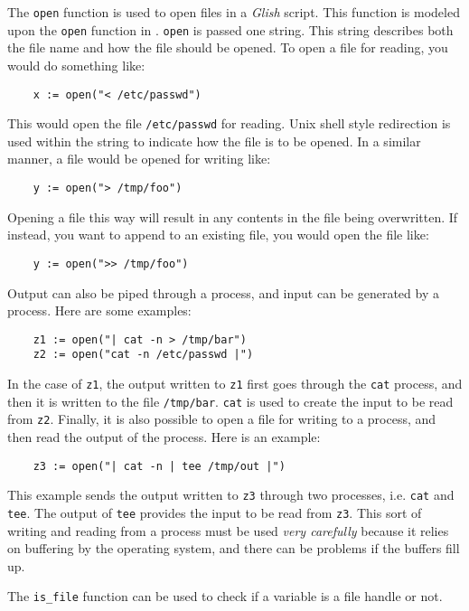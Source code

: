 The {\tt open} function is used to open files in a {\em Glish} script. This function is
modeled upon the {\tt open} function in . {\tt open}
is passed one string. This string describes both the file name and how the file should be opened.
To open a file for reading, you would do something like:
\begin{verbatim}
    x := open("< /etc/passwd")
\end{verbatim}
This would open the file {\tt /etc/passwd} for reading. {\sc Unix} shell style redirection is
used within the string to indicate how the file is to be opened. In a similar manner, a
file would be opened for writing like:
\begin{verbatim}
    y := open("> /tmp/foo")
\end{verbatim}
Opening a file this way will result in any contents in the file being overwritten. If instead,
you want to append to an existing file, you would open the file like:
\begin{verbatim}
    y := open(">> /tmp/foo")
\end{verbatim}
Output can also be piped through a process, and input can be generated by a process. Here
are some examples:
\begin{verbatim}
    z1 := open("| cat -n > /tmp/bar")
    z2 := open("cat -n /etc/passwd |")
\end{verbatim}
In the case of {\tt z1}, the output written to {\tt z1} first goes through the {\tt cat}
process, and then it is written to the file {\tt /tmp/bar}. {\tt cat} is used to create
the input to be read from {\tt z2}. Finally, it is also possible to open a file for writing
to a process, and then read the output of the process. Here is an example:
\begin{verbatim}
    z3 := open("| cat -n | tee /tmp/out |")
\end{verbatim}
This example sends the output written to {\tt z3} through two processes, i.e. {\tt cat} and
{\tt tee}. The output of {\tt tee} provides the input to be read from {\tt z3}. This sort of
writing and reading from a process must be used {\em very carefully} because it relies on
buffering by the operating system, and there can be problems if the buffers fill up.

\label{is_file-func}
The {\tt is\_file} function can be used to check if a variable is a file handle
or not.

